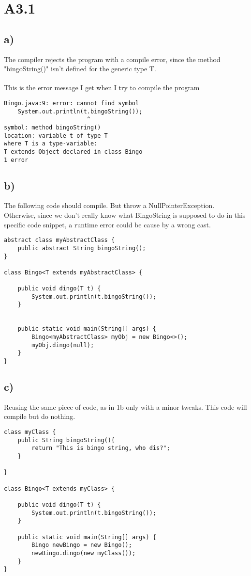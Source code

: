 \section{A3.1}

\subsection{a)}
The compiler rejects the program with a compile error, since the method
"bingoString()" isn't defined for the generic type T.
\\
\\
This is the error message I get when I try to compile the program
\begin{verbatim}
Bingo.java:9: error: cannot find symbol
    System.out.println(t.bingoString());
                        ^
symbol: method bingoString()
location: variable t of type T
where T is a type-variable:
T extends Object declared in class Bingo
1 error
\end{verbatim}

\subsection{b)}
The following code should compile. But throw a NullPointerException. Otherwise, since we don't
really know what BingoString is supposed to do in this specific code snippet, a runtime error could
be cause by a wrong cast.

\begin{verbatim}
abstract class myAbstractClass {
    public abstract String bingoString();
}

class Bingo<T extends myAbstractClass> {

    public void dingo(T t) {
        System.out.println(t.bingoString());
    }


    public static void main(String[] args) {
        Bingo<myAbstractClass> myObj = new Bingo<>();
        myObj.dingo(null);
    }
}
\end{verbatim}

\subsection{c)}
Reusing the same piece of code, as in 1b only with a minor tweaks. This code will compile but do nothing.
\begin{verbatim}
class myClass {
    public String bingoString(){
        return "This is bingo string, who dis?";
    }

}

class Bingo<T extends myClass> {

    public void dingo(T t) {
        System.out.println(t.bingoString());
    }

    public static void main(String[] args) {
        Bingo newBingo = new Bingo();
        newBingo.dingo(new myClass());
    }
}
\end{verbatim}

